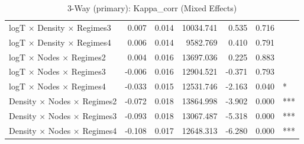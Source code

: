 \begin{table}[ht]
\begin{tabular}{lrrrrrl}
  logT × Density × Regimes3 & 0.007 & 0.014 & 10034.741 & 0.535 & 0.716 &  \\ 
  logT × Density × Regimes4 & 0.006 & 0.014 & 9582.769 & 0.410 & 0.791 &  \\ 
  logT × Nodes × Regimes2 & 0.004 & 0.016 & 13697.036 & 0.225 & 0.883 &  \\ 
  logT × Nodes × Regimes3 & -0.006 & 0.016 & 12904.521 & -0.371 & 0.793 &  \\ 
  logT × Nodes × Regimes4 & -0.033 & 0.015 & 12531.746 & -2.163 & 0.040 & * \\ 
  Density × Nodes × Regimes2 & -0.072 & 0.018 & 13864.998 & -3.902 & 0.000 & *** \\ 
  Density × Nodes × Regimes3 & -0.093 & 0.018 & 13067.487 & -5.318 & 0.000 & *** \\ 
  Density × Nodes × Regimes4 & -0.108 & 0.017 & 12648.313 & -6.280 & 0.000 & *** \\ 
   \hline
\end{tabular}
\caption{3-Way (primary): Kappa_corr (Mixed Effects)} 
\end{table}
